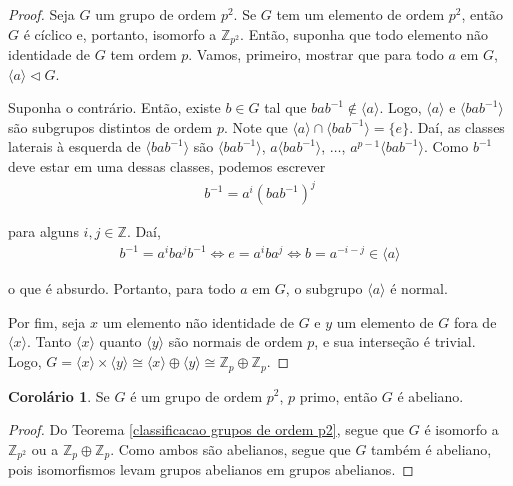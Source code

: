 \documentclass[a4paper,portuguese,11pt,twoside, leqno]{book}
\theoremstyle{definition}
\newtheorem{corollary}{Corolário}[theorem]
\begin{document}
	\begin{proof}
		Seja $G$ um grupo de ordem $p^2$. Se $G$ tem um elemento de ordem $p^2$, então $G$ é cíclico e, portanto, isomorfo a $\mathbb{Z}_{p^2}$. Então, suponha que todo elemento não identidade de $G$ tem ordem $p$. Vamos, primeiro, mostrar que para todo $a$ em $G$, $\langle a \rangle\vartriangleleft G$.
		
		\par\vspace{0.3cm} Suponha o contrário. Então, existe $b\in G$ tal que $bab^{-1}\notin\langle a \rangle$. Logo, $\langle a \rangle$ e $\langle bab^{-1} \rangle$ são subgrupos distintos de ordem $p$. Note que $\langle a \rangle\cap \langle bab^{-1} \rangle = \{e\}$. Daí, as classes laterais à esquerda de $\langle bab^{-1} \rangle$ são $\langle bab^{-1} \rangle$, $a\langle bab^{-1} \rangle$, $\dots$, $a^{p-1}\langle bab^{-1} \rangle$. Como $b^{-1}$ deve estar em uma dessas classes, podemos escrever
		\begin{align*}
		b^{-1} = a^i(bab^{-1})^j
		\end{align*}
		\par\vspace{0.3cm} para alguns $i,j\in\mathbb{Z}$. Daí,
		\begin{align*}
		b^{-1} = a^iba^jb^{-1} \Leftrightarrow e = a^iba^j \Leftrightarrow b = a^{-i-j}\in \langle a \rangle
		\end{align*}
		
		\par\vspace{0.3cm} o que é absurdo. Portanto, para todo $a$ em $G$, o subgrupo $\langle a \rangle$ é normal. 
		\par\vspace{0.3cm} Por fim, seja $x$ um elemento não identidade de $G$ e $y$ um elemento de $G$ fora de $\langle x \rangle$. Tanto $\langle x \rangle$ quanto $\langle y \rangle$ são normais de ordem $p$, e sua interseção é trivial. Logo, $G = \langle x \rangle\times\langle y \rangle\cong \langle x \rangle\oplus\langle y \rangle \cong \mathbb{Z}_p\oplus\mathbb{Z}_p$.
		
	\end{proof}
	
	\begin{corollary}
		\label{ordem p^2 implica abeliano}
		Se $G$ é um grupo de ordem $p^2$, $p$ primo, então $G$ é abeliano.
	\end{corollary}
	
	\begin{proof}
		Do Teorema \eqref{classificacao grupos de ordem p2}, segue que $G$ é isomorfo a $\mathbb{Z}_{p^2}$ ou a $\mathbb{Z}_p\oplus\mathbb{Z}_p$. Como ambos são abelianos, segue que $G$ também é abeliano, pois isomorfismos levam grupos abelianos em grupos abelianos.
	\end{proof}
	
\end{document}
